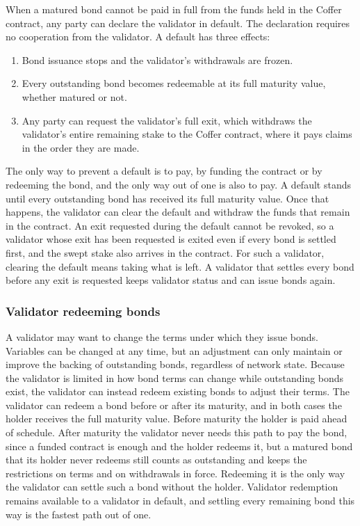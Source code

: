 \documentclass{article}
\begin{document}
When a matured bond cannot be paid in full from the funds held in the Coffer contract, any party can declare the validator in default. The declaration requires no cooperation from the validator. A default has three effects:

\begin{enumerate}
    \item Bond issuance stops and the validator's withdrawals are frozen.
    \item Every outstanding bond becomes redeemable at its full maturity value, whether matured or not.
    \item Any party can request the validator's full exit, which withdraws the validator's entire remaining stake to the Coffer contract, where it pays claims in the order they are made.
\end{enumerate}

The only way to prevent a default is to pay, by funding the contract or by redeeming the bond, and the only way out of one is also to pay. A default stands until every outstanding bond has received its full maturity value. Once that happens, the validator can clear the default and withdraw the funds that remain in the contract. An exit requested during the default cannot be revoked, so a validator whose exit has been requested is exited even if every bond is settled first, and the swept stake also arrives in the contract. For such a validator, clearing the default means taking what is left. A validator that settles every bond before any exit is requested keeps validator status and can issue bonds again.

\subsubsection{Validator redeeming bonds}
A validator may want to change the terms under which they issue bonds. Variables can be changed at any time, but an adjustment can only maintain or improve the backing of outstanding bonds, regardless of network state. Because the validator is limited in how bond terms can change while outstanding bonds exist, the validator can instead redeem existing bonds to adjust their terms. The validator can redeem a bond before or after its maturity, and in both cases the holder receives the full maturity value. Before maturity the holder is paid ahead of schedule. After maturity the validator never needs this path to pay the bond, since a funded contract is enough and the holder redeems it, but a matured bond that its holder never redeems still counts as outstanding and keeps the restrictions on terms and on withdrawals in force. Redeeming it is the only way the validator can settle such a bond without the holder. Validator redemption remains available to a validator in default, and settling every remaining bond this way is the fastest path out of one.
\end{document}
